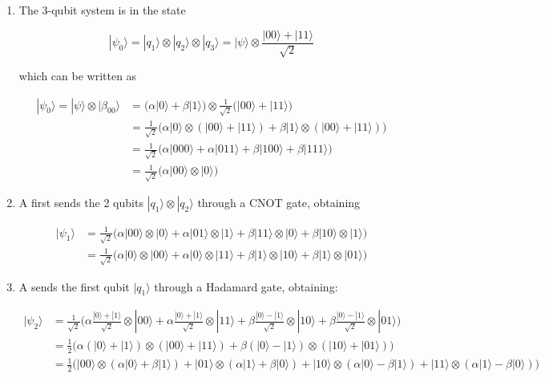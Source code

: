 \documentclass{article}
\theoremstyle{definition}
\begin{document}
  \begin{enumerate}
    \item The 3-qubit system is in the state

      \[|\psi_0 \rangle = |q_1 \rangle \otimes |q_2 \rangle \otimes |q_3 \rangle = |\psi \rangle \otimes \frac{|00\rangle + |11\rangle}{\sqrt{2}}\]

    which can be written as 

    \begin{align*} 
      |\psi_0 \rangle = |\psi \rangle \otimes |\beta_{00}\rangle & = \big( \alpha |0\rangle + \beta |1\rangle \big) \otimes \frac{1}{\sqrt{2}} \big( |00\rangle + |11\rangle \big) \\
      & = \frac{1}{\sqrt{2}} \Big( \alpha |0\rangle \otimes (|00\rangle + |11\rangle ) + \beta |1\rangle \otimes (|00\rangle + |11\rangle )\Big) \\
      & = \frac{1}{\sqrt{2}} \Big( \alpha |000\rangle + \alpha |011\rangle + \beta |100\rangle + \beta |111\rangle\Big) \\
      & = \frac{1}{\sqrt{2}} \big( \alpha |00\rangle \otimes |0\rangle \big)
    \end{align*}
    
    \item A first sends the 2 qubits $|q_1 \rangle \otimes |q_2 \rangle$ through a CNOT gate, obtaining 

    \begin{align*} 
      |\psi_1 \rangle & = \frac{1}{\sqrt{2}} \big( \alpha |00\rangle \otimes |0\rangle + \alpha |01\rangle \otimes |1\rangle + \beta |11\rangle \otimes |0\rangle + \beta |10\rangle \otimes |1\rangle \big) \\
      & = \frac{1}{\sqrt{2}} \big( \alpha |0\rangle \otimes |00\rangle + \alpha |0\rangle \otimes |11\rangle + \beta |1\rangle \otimes |10\rangle + \beta |1\rangle \otimes |01\rangle \big)
    \end{align*}
    
    \item A sends the first qubit $|q_1\rangle$ through a Hadamard gate, obtaining: 

    \begin{align*}
      |\psi_2 \rangle & = \frac{1}{\sqrt{2}} \bigg( \alpha \frac{|0\rangle + |1\rangle}{\sqrt{2}} \otimes |00\rangle + \alpha \frac{|0\rangle + |1\rangle}{\sqrt{2}} \otimes |11\rangle + \beta \frac{|0\rangle - |1\rangle}{\sqrt{2}} \otimes |10 \rangle + \beta \frac{|0\rangle - |1\rangle}{\sqrt{2}} \otimes |01 \rangle \bigg) \\
      & = \frac{1}{2} \Big( \alpha (|0\rangle + |1\rangle) \otimes (|00\rangle + |11\rangle) + \beta (|0\rangle - |1\rangle) \otimes (|10\rangle + |01\rangle)\Big) \\
      & = \frac{1}{2} \Big( |00\rangle \otimes (\alpha |0\rangle + \beta |1\rangle ) + |01\rangle \otimes (\alpha |1\rangle + \beta |0\rangle) + |10\rangle \otimes (\alpha |0\rangle - \beta |1\rangle ) + |11\rangle \otimes (\alpha |1\rangle - \beta |0\rangle )\Big)
    \end{align*}


\end{enumerate}
\end{document}
